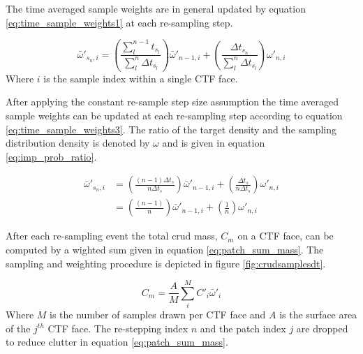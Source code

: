 The time averaged sample weights are in general updated by equation \ref{eq:time_sample_weights1} at each re-sampling step.

\begin{equation}
\bar \omega'_{{s_n},i} = 
\left( \frac{\sum_{l}^{n-1}t_{s_l}}{\sum_l^n \Delta t_{s_l}} \right) \bar \omega'_{n-1,i} + 
\left( \frac{\Delta t_{s_n}}{\sum_l^n \Delta t_{s_l}} \right) \omega'_{n,i}
\label{eq:time_sample_weights1}
\end{equation}
Where $i$ is the sample index within a single CTF face.

After applying the constant re-sample step size assumption the time averaged sample weights can be updated at each re-sampling step according to equation \ref{eq:time_sample_weights3}.
The ratio of the target density and the sampling distribution density is denoted by $\omega$ and is given in equation \ref{eq:imp_prob_ratio}. 

\begin{align}
\bar \omega'_{{s_n},i} &= \left( \frac{(n-1) \Delta t_s}{n \Delta t_s} \right) \bar \omega'_{n-1,i} + \left( \frac{\Delta t_s}{n \Delta t_s} \right) \omega'_{n,i} \nonumber \\
 &= \left( \frac{(n-1)}{n} \right) \bar \omega'_{n-1,i} + \left( \frac{1}{n} \right) \omega'_{n,i}
\label{eq:time_sample_weights3}
\end{align}

After each re-sampling event the total crud mass, $C_m$ on a CTF face, can be computed by a wighted sum given in equation \ref{eq:patch_sum_mass}.  The sampling and weighting procedure is depicted in figure \ref{fig:crudsamplesdt}.

\begin{equation}
C_{m} = \frac{A}{M}\sum_i^M C'_i \bar \omega'_i
\label{eq:patch_sum_mass}
\end{equation}
Where $M$ is the number of samples drawn per CTF face and $A$ is the surface area of the $j^{th}$ CTF face.  The re-stepping index $n$ and the patch index $j$ are dropped to reduce clutter in equation \ref{eq:patch_sum_mass}.

